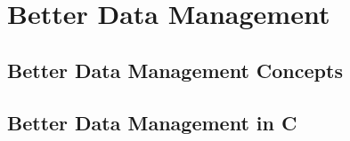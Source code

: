 \chapter{Better Data Management} %
\label{cha:better_data_management}

\minitoc

\section{Better Data Management Concepts} %
\label{sec:better_data_management_concepts}







\clearpage
\section{Better Data Management in C} %
\label{sec:better_data_management_in_c}





